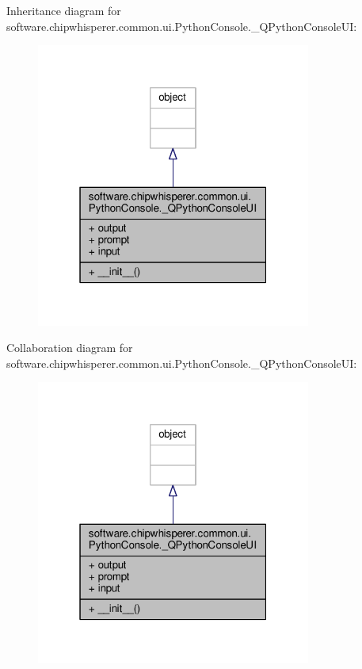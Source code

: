 Inheritance diagram for software.\+chipwhisperer.\+common.\+ui.\+Python\+Console.\+\_\+\+Q\+Python\+Console\+U\+I\+:\nopagebreak
\begin{figure}[H]
\begin{center}
\leavevmode
\includegraphics[width=256pt]{d3/d1c/classsoftware_1_1chipwhisperer_1_1common_1_1ui_1_1PythonConsole_1_1__QPythonConsoleUI__inherit__graph}
\end{center}
\end{figure}


Collaboration diagram for software.\+chipwhisperer.\+common.\+ui.\+Python\+Console.\+\_\+\+Q\+Python\+Console\+U\+I\+:\nopagebreak
\begin{figure}[H]
\begin{center}
\leavevmode
\includegraphics[width=256pt]{d8/d6d/classsoftware_1_1chipwhisperer_1_1common_1_1ui_1_1PythonConsole_1_1__QPythonConsoleUI__coll__graph}
\end{center}
\end{figure}


